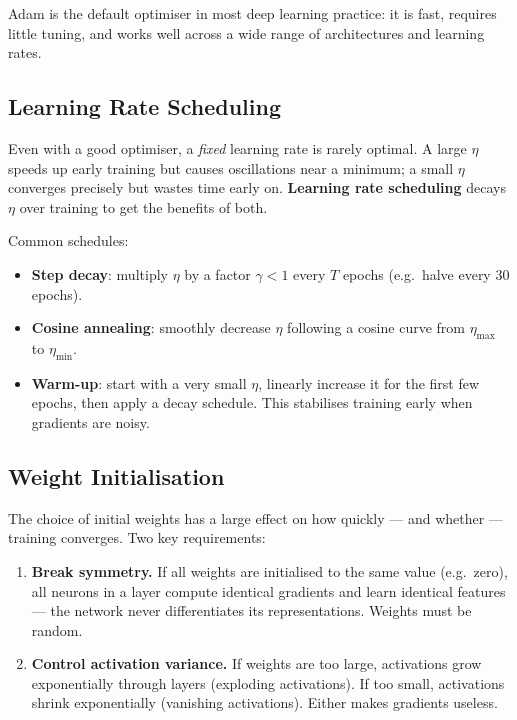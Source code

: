 \documentclass[11pt,a4paper]{article}
\newcommand{\term}[1]{\textcolor{DefGreen}{\textbf{#1}}}
\begin{document}
Adam is the default optimiser in most deep learning practice: it is fast, requires little tuning, and works well across a wide range of architectures and learning rates.

\subsection{Learning Rate Scheduling}

Even with a good optimiser, a \emph{fixed} learning rate is rarely optimal. A large $\eta$ speeds up early training but causes oscillations near a minimum; a small $\eta$ converges precisely but wastes time early on. \term{Learning rate scheduling} decays $\eta$ over training to get the benefits of both.

Common schedules:
\begin{itemize}
  \item \textbf{Step decay}: multiply $\eta$ by a factor $\gamma < 1$ every $T$ epochs (e.g.\ halve every 30 epochs).
  \item \textbf{Cosine annealing}: smoothly decrease $\eta$ following a cosine curve from $\eta_{\max}$ to $\eta_{\min}$.
  \item \textbf{Warm-up}: start with a very small $\eta$, linearly increase it for the first few epochs, then apply a decay schedule. This stabilises training early when gradients are noisy.
\end{itemize}

\subsection{Weight Initialisation}

The choice of initial weights has a large effect on how quickly — and whether — training converges. Two key requirements:

\begin{enumerate}
  \item \textbf{Break symmetry.} If all weights are initialised to the same value (e.g.\ zero), all neurons in a layer compute identical gradients and learn identical features — the network never differentiates its representations. Weights must be random.
  \item \textbf{Control activation variance.} If weights are too large, activations grow exponentially through layers (exploding activations). If too small, activations shrink exponentially (vanishing activations). Either makes gradients useless.
\end{enumerate}
\end{document}
